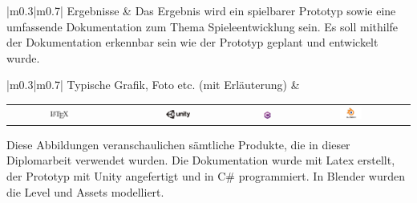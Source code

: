 \vspace{10pt}

\noindent
\begin{tabular}{|m{0.3\textwidth}|m{0.7\textwidth}|}
\hline
Ergebnisse & Das Ergebnis wird ein spielbarer Prototyp sowie eine umfassende Dokumentation zum Thema Spieleentwicklung sein. Es soll mithilfe der Dokumentation erkennbar sein wie der Prototyp geplant und entwickelt wurde.  \\
\hline
\end{tabular}

\pagebreak
\pagebreak
\noindent
\begin{tabular}{|m{0.3\textwidth}|m{0.7\textwidth}|}
\hline
Typische Grafik, Foto etc. (mit Erläuterung) &
\begin{minipage}{\linewidth}
  \centering
  \begin{tabular}{cccc}
    \includegraphics[width=0.2\textwidth]{chapters/00/images/latex.png} &
    \includegraphics[width=0.2\textwidth]{chapters/00/images/unity.png} &
    \includegraphics[width=0.2\textwidth]{chapters/00/images/Csharp.png} &
    \includegraphics[width=0.2\textwidth]{chapters/00/images/blender.png}
  \end{tabular}
  
  \vspace{10pt}
  
  \begin{flushleft}
    Diese Abbildungen veranschaulichen sämtliche Produkte, die in dieser Diplomarbeit verwendet wurden. Die Dokumentation wurde mit Latex erstellt, der Prototyp mit Unity angefertigt und in C\# programmiert. In Blender wurden die Level und Assets modelliert.
  \end{flushleft}
  
  \vspace{10pt}

\end{minipage} \\
\hline
\end{tabular}

